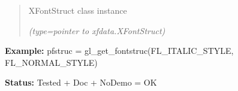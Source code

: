 \begin{boxedminipage}{\funcwidth}
      \begin{quote}
      XFontStruct class instance

      {\it (type=pointer to xfdata.XFontStruct)}

      \end{quote}

\textbf{Example:} pfstruc = gl\_get\_fontstruc(FL\_ITALIC\_STYLE, FL\_NORMAL\_STYLE)



\textbf{Status:} Tested + Doc + NoDemo = OK



    \end{boxedminipage}

    \label{xformslib:flxbasic:fl_get_fontstruct}

    \vspace{0.5ex}

